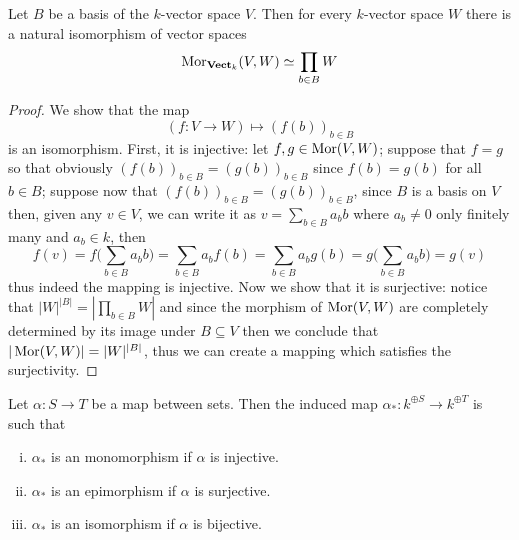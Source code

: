 \begin{proposition}
Let \(B\) be a basis of the \(k\)-vector space \(V\). Then for every
\(k\)-vector space \(W\) there is a natural isomorphism of vector spaces
\[
  \operatorname{Mor}_{{\textbf{Vect}}_k}(V, W) \simeq \prod_{b \in B} W
\]
\end{proposition}

\begin{proof}
We show that the map
\[
  (f: V \to W) \longmapsto (f(b))_{b \in B}
\]
is an isomorphism. First, it is injective: let \(f, g \in \operatorname{Mor}(V, W)\);
suppose that \(f = g\) so that obviously \((f(b))_{b \in B} = (g(b))_{b \in
B}\) since \(f(b) = g(b)\) for all \(b \in B\); suppose now that \((f(b))_{b
\in B} = (g(b))_{b \in B}\), since \(B\) is a basis on \(V\) then, given any
\(v \in V\), we can write it as \(v = \sum_{b \in B} a_b b\) where \(a_b \neq
0\) only finitely many and \(a_b \in k\), then
\[
  f(v) = f\bigg(\sum_{b \in B} a_b b\bigg) = \sum_{b \in B} a_b f(b)
  = \sum_{b \in B} a_b g(b) = g\bigg(\sum_{b \in B} a_b b\bigg) = g(v)
\]
thus indeed the mapping is injective. Now we show that it is surjective:
notice that \(|W|^{|B|} = \left| \prod_{b \in B} W \right|\) and since the
morphism of \(\operatorname{Mor}(V, W)\) are completely determined by its image under \(B
\subseteq V\) then we conclude that \(|\operatorname{Mor}(V, W)| = |W|^{|B|}\), thus we can
create a mapping which satisfies the surjectivity.
\end{proof}

\begin{proposition}
Let \(\alpha : S \to T\) be a map between sets. Then the induced map
\(\alpha_\ast : k^{\oplus S} \to k^{\oplus T}\) is such that
\begin{enumerate}[i.]
  \item \(\alpha_\ast\) is an monomorphism if \(\alpha\) is injective.
  \item \(\alpha_\ast\) is an epimorphism if \(\alpha\) is surjective.
  \item \(\alpha_\ast\) is an isomorphism if \(\alpha\) is bijective.
\end{enumerate}
\end{proposition}

